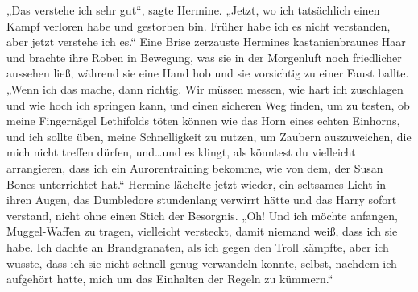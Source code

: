 „Das verstehe ich sehr gut“, sagte Hermine. „Jetzt, wo ich tatsächlich einen Kampf verloren habe und gestorben bin. Früher habe ich es nicht verstanden, aber jetzt verstehe ich es.“
Eine Brise zerzauste Hermines kastanienbraunes Haar und brachte ihre Roben in Bewegung, was sie in der Morgenluft noch friedlicher aussehen ließ, während sie eine Hand hob und sie vorsichtig zu einer Faust ballte.
„Wenn ich das mache, dann richtig. Wir müssen messen, wie hart ich zuschlagen und wie hoch ich springen kann, und einen sicheren Weg finden, um zu testen, ob meine Fingernägel Lethifolds töten können wie das Horn eines echten Einhorns, und ich sollte üben, meine Schnelligkeit zu nutzen, um Zaubern auszuweichen, die mich nicht treffen dürfen, und…und es klingt, als könntest du vielleicht arrangieren, dass ich ein Aurorentraining bekomme, wie von dem, der Susan Bones unterrichtet hat.“
Hermine lächelte jetzt wieder, ein seltsames Licht in ihren Augen, das Dumbledore stundenlang verwirrt hätte und das Harry sofort verstand, nicht ohne einen Stich der Besorgnis.
„Oh! Und ich möchte anfangen, Muggel-Waffen zu tragen, vielleicht versteckt, damit niemand weiß, dass ich sie habe. Ich dachte an Brandgranaten, als ich gegen den Troll kämpfte, aber ich wusste, dass ich sie nicht schnell genug verwandeln konnte, selbst, nachdem ich aufgehört hatte, mich um das Einhalten der Regeln zu kümmern.“

